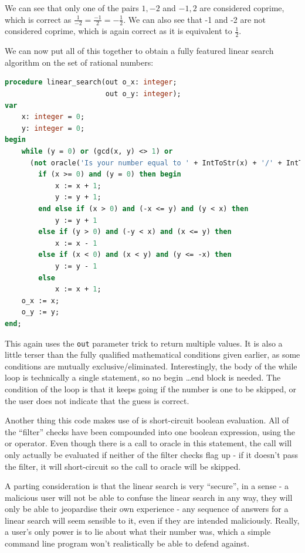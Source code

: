 \documentclass{article}
\begin{document}
    We can see that only one of the pairs $1, -2$ and $-1, 2$ are considered
    coprime, which is correct as $\frac{1}{-2} = \frac{-1}{2} = -\frac{1}{2}$.
    We can also see that -1 and -2 are not considered coprime, which is again
    correct as it is equivalent to $\frac{1}{2}$.

    We can now put all of this together to obtain a fully featured linear
    search algorithm on the set of rational numbers:

\begin{lstlisting}[language=Pascal, caption=Linear search on $\mathbb{Q}$ implementation in Pascal]
procedure linear_search(out o_x: integer;
                        out o_y: integer);
var
    x: integer = 0;
    y: integer = 0;
begin
    while (y = 0) or (gcd(x, y) <> 1) or
      (not oracle('Is your number equal to ' + IntToStr(x) + '/' + IntToStr(y) + '? ')) do
        if (x >= 0) and (y = 0) then begin
            x := x + 1;
            y := y + 1;
        end else if (x > 0) and (-x <= y) and (y < x) then
            y := y + 1
        else if (y > 0) and (-y < x) and (x <= y) then
            x := x - 1
        else if (x < 0) and (x < y) and (y <= -x) then
            y := y - 1
        else
            x := x + 1;
    o_x := x;
    o_y := y;
end;
\end{lstlisting}
    
    This again uses the \verb|out| parameter trick to return multiple values.
    It is also a little terser than the fully qualified mathematical conditions
    given earlier, as some conditions are mutually exclusive/eliminated.
    Interestingly, the body of the while loop is technically a single
    statement, so no begin \ldots end block is needed. The condition of the
    loop is that it keeps going if the number is one to be skipped, or the user
    does not indicate that the guess is correct.

    Another thing this code makes use of is short-circuit boolean evaluation.
    All of the ``filter'' checks have been compounded into one boolean
    expression, using the or operator. Even though there is a call to oracle in
    this statement, the call will only actually be evaluated if neither of the
    filter checks flag up - if it doesn't pass the filter, it will
    short-circuit so the call to oracle will be skipped.

    A parting consideration is that the linear search is very ``secure'', in a
    sense - a malicious user will not be able to confuse the linear search in
    any way, they will only be able to jeopardise their own experience - any
    sequence of answers for a linear search will seem sensible to it, even if
    they are intended maliciously. Really, a user's only power is to lie about
    what their number was, which a simple command line program won't
    realistically be able to defend against.
\end{document}

